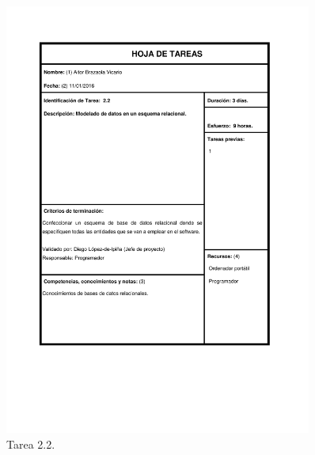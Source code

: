 \documentclass{DeustoFDP}
\begin{document}
\begin{figure}[H]
	\centering
	\includegraphics[width=0.9\textwidth]{fig/Tareas/22}
	\caption{Tarea 2.2.}
	\label{fig:t22}
\end{figure}
\end{document}

